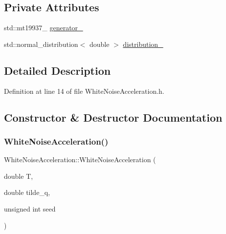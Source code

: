 \subsection*{Private Attributes}
\begin{DoxyCompactItemize}
\item 
std\+::mt19937\+\_ \mbox{\hyperlink{classbfl_1_1WhiteNoiseAcceleration_a53532f567190af8a0baa579e3bd4e362}{generator\+\_\+}}
\item 
std\+::normal\+\_\+distribution$<$ double $>$ \mbox{\hyperlink{classbfl_1_1WhiteNoiseAcceleration_a771c84333ff5fd6f22a3096cca69352b}{distribution\+\_\+}}
\end{DoxyCompactItemize}


\subsection{Detailed Description}


Definition at line 14 of file White\+Noise\+Acceleration.\+h.



\subsection{Constructor \& Destructor Documentation}
\mbox{\label{classbfl_1_1WhiteNoiseAcceleration_a89ae84e738630af333280d1f486aedeb}} 
\subsubsection{\texorpdfstring{White\+Noise\+Acceleration()}{WhiteNoiseAcceleration()}\hspace{0.1cm}{\footnotesize\ttfamily [1/5]}}
{\footnotesize\ttfamily White\+Noise\+Acceleration\+::\+White\+Noise\+Acceleration (\begin{DoxyParamCaption}\item[{double}]{T,  }\item[{double}]{tilde\+\_\+q,  }\item[{unsigned int}]{seed }\end{DoxyParamCaption})\hspace{0.3cm}{\ttfamily [noexcept]}}



